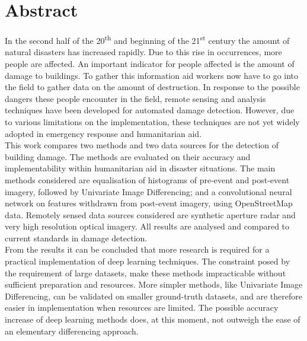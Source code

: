 \chapter*{Abstract}
In the second half of the 20\textsuperscript{th} and beginning of the 21\textsuperscript{st} century the amount of natural disasters has increased rapidly. Due to this rise in occurrences, more people are affected. An important indicator for people affected is the amount of damage to buildings. To gather this information aid workers now have to go into the field to gather data on the amount of destruction. In response to the possible dangers these people encounter in the field, remote sensing and analysis techniques have been developed for automated damage detection. However, due to various limitations on the implementation, these techniques are not yet widely adopted in emergency response and humanitarian aid.\\

\noindent This work compares two methods and two data sources for the detection of building damage. The methods are evaluated on their accuracy and implementability within humanitarian aid in disaster situations. The main methods considered are equalisation of histograms of pre-event and post-event imagery, followed by Univariate Image Differencing; and a convolutional neural network on features withdrawn from post-event imagery, using OpenStreetMap data. Remotely sensed data sources considered are synthetic aperture radar and very high resolution optical imagery. All results are analysed and compared to current standards in damage detection. \\

\noindent From the results it can be concluded that more research is required for a practical implementation of deep learning techniques. The constraint posed by the requirement of large datasets, make these methods impracticable without sufficient preparation and resources. More simpler methods, like Univariate Image Differencing, can be validated on smaller ground-truth datasets, and are therefore easier in implementation when resources are limited. The possible accuracy increase of deep learning methods does, at this moment, not outweigh the ease of an elementary differencing approach.